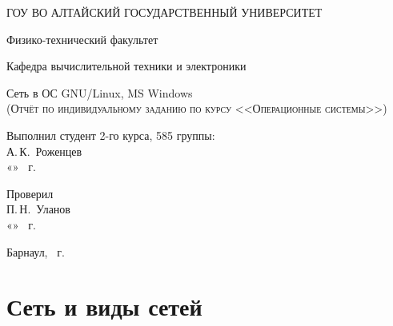 \documentclass[a4paper,14pt]{extarticle}
\begin{document}
\begin{titlepage}
  \begin{center}
    ГОУ ВО АЛТАЙСКИЙ ГОСУДАРСТВЕННЫЙ УНИВЕРСИТЕТ
    \vspace{0.25cm}
    
    Физико-технический факультет
    
    Кафедра вычислительной техники и электроники
    \vfill
    
    {\LARGE Сеть в ОС GNU/Linux, MS Windows}\\[5mm]
    \textsc{(Отчёт по индивидуальному заданию по курсу <<Операционные системы>>)}
  \bigskip

\end{center}
\vfill

\newlength{\ML}
\hfill\begin{minipage}{0.4\textwidth}
  Выполнил студент 2-го курса, 585 группы:\\
  \underline{\hspace{\ML}} А.\,К.~Роженцев\\
  «\underline{\hspace{0.7cm}}» \underline{\hspace{2cm}} \the\year~г.
\end{minipage}%
\bigskip

\hfill\begin{minipage}{0.4\textwidth}
  Проверил\\
  \underline{\hspace{\ML}} П.\,Н.~Уланов\\
  «\underline{\hspace{0.7cm}}» \underline{\hspace{2cm}} \the\year~г.
\end{minipage}%
\vfill

\begin{center}
  Барнаул, \the\year~г.
\end{center}
\end{titlepage}


\tableofcontents
\newpage
\section{Сеть и виды сетей} %
\end{document}
